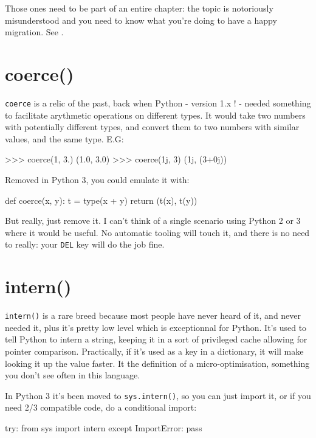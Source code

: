Those ones need to be part of an entire chapter: the topic is notoriously misunderstood and you need to know what you're doing to have a happy migration. See .

\section{coerce()}

\lstinline{coerce} is a relic of the past, back when Python - version 1.x ! - needed something to facilitate arythmetic operations on different types. It would take two numbers with potentially different types, and convert them to two numbers with similar values, and the same type. E.G:

\begin{py2}
>>> coerce(1, 3.)
(1.0, 3.0)
>>> coerce(1j, 3)
(1j, (3+0j))
\end{py2}

Removed in Python 3, you could emulate it with:

\begin{py2and3}
def coerce(x, y):
    t = type(x + y)
    return (t(x), t(y))
\end{py2and3}

But really, just remove it. I can't think of a single scenario using Python 2 or 3 where it would be useful. No automatic tooling will touch it, and there is no need to really: your \lstinline{DEL} key will do the job fine.


\section{intern()}

\lstinline{intern()} is a rare breed because most people have never heard of it, and never needed it, plus it's pretty low level which is exceptionnal for Python. It's used to tell Python to intern a string, keeping it in a sort of privileged cache allowing for pointer comparison. Practically, if it's used as a key in a dictionary, it will make looking it up the value faster. It the definition of a micro-optimisation, something you don't see often in this language.

In Python 3 it's been moved to \lstinline{sys.intern()}, so you can just import it, or if you need 2/3 compatible code, do a conditional import:

\begin{py2and3}
try:
    from sys import intern
except ImportError:
    pass
\end{py2and3}

